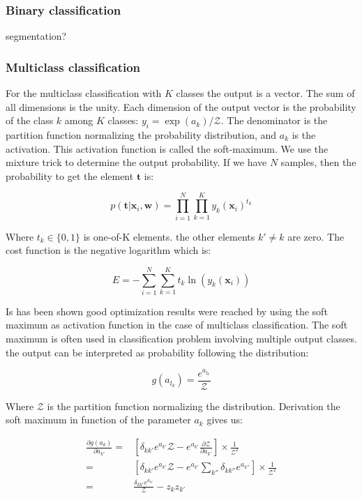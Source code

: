 \documentclass[final, paper=letter,5p,times,twocolumn]{elsarticle}
\begin{document}
\subsubsection{Binary classification}

segmentation?

\subsubsection{Multiclass classification}
\label{sec:MulticlassClassification}

For the multiclass classification with $K$ classes the output is a vector. The sum of all dimensions is the unity. Each dimension of the output vector is the probability of the class $k$ among $K$ classes: $y_{i} = \exp(a_{k}) / \mathcal{Z}$. The denominator is the partition function normalizing the probability distribution, and $a_{k}$ is the activation. This activation function is called the soft-maximum. We use the mixture trick to determine the output probability. If we have $N$ samples, then the probability to get the element $\bm{t}$ is:

\begin{equation}
p(\bm{t} | \bm{x}_{i}, \bm{w}) = \prod_{i=1}^{N}\prod_{k=1}^{K} y_{k}(\bm{x}_{i})^{t_{k}}
\end{equation}

Where $t_{k} \in \{0,1\}$ is one-of-K elements. the other elements $k' \ne k$ are zero. The cost function is the negative logarithm which is:

\begin{equation}
E = - \sum_{i=1}^{N}\sum_{k=1}^{K} t_{k} \ln (y_{k}(\bm{x}_{i}))
\end{equation}

Is has been shown good optimization results were reached by using the soft maximum as activation function in the case of multiclass classification. The soft maximum is often used in classification problem involving multiple output classes. the output can be interpreted as probability following the distribution:

\begin{equation}
  g(a_{l_{k}}) = \frac{e^{a_{l_{k}}}}{\mathcal{Z}}
  \label{soft_max}
\end{equation}

Where $\mathcal{Z}$ is the partition function normalizing the distribution. Derivation the soft maximum in function of the parameter $a_{k}$ gives us:

\begin{equation*}
  \begin{split}
    \frac{\partial g(a_{k})}{\partial a_{k'}} = & \left \lbrack \delta_{kk'} e^{a_{k'}} \mathcal{Z} - e^{a_{k'}}\frac{\partial \mathcal{Z}}{\partial a_{k'}} \right \rbrack \times \frac{1}{\mathcal{Z}^{2}}\\
    = & \left \lbrack \delta_{kk'} e^{a_{k'}} \mathcal{Z} - e^{a_{k'}} \sum_{k''} \delta_{kk''} e^{a_{k''}}  \right \rbrack \times \frac{1}{\mathcal{Z}^{2}}\\
    = & \frac{\delta_{kk'} e^{a_{k'}}}{\mathcal{Z}} - z_{k}z_{k'}\\
  \end{split}
\end{equation*}
\end{document}
